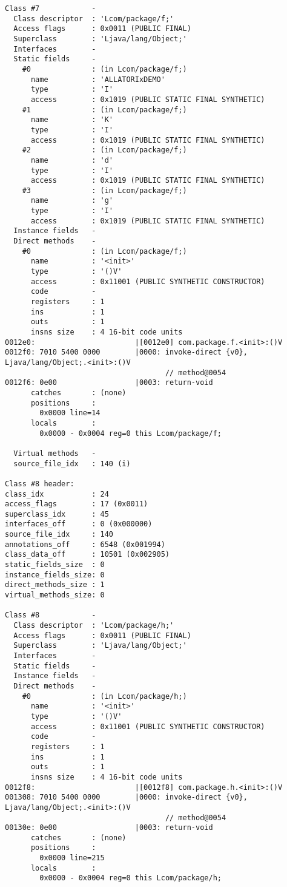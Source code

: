 \begin{lstlisting}
Class #7            -
  Class descriptor  : 'Lcom/package/f;'
  Access flags      : 0x0011 (PUBLIC FINAL)
  Superclass        : 'Ljava/lang/Object;'
  Interfaces        -
  Static fields     -
    #0              : (in Lcom/package/f;)
      name          : 'ALLATORIxDEMO'
      type          : 'I'
      access        : 0x1019 (PUBLIC STATIC FINAL SYNTHETIC)
    #1              : (in Lcom/package/f;)
      name          : 'K'
      type          : 'I'
      access        : 0x1019 (PUBLIC STATIC FINAL SYNTHETIC)
    #2              : (in Lcom/package/f;)
      name          : 'd'
      type          : 'I'
      access        : 0x1019 (PUBLIC STATIC FINAL SYNTHETIC)
    #3              : (in Lcom/package/f;)
      name          : 'g'
      type          : 'I'
      access        : 0x1019 (PUBLIC STATIC FINAL SYNTHETIC)
  Instance fields   -
  Direct methods    -
    #0              : (in Lcom/package/f;)
      name          : '<init>'
      type          : '()V'
      access        : 0x11001 (PUBLIC SYNTHETIC CONSTRUCTOR)
      code          -
      registers     : 1
      ins           : 1
      outs          : 1
      insns size    : 4 16-bit code units
0012e0:                       |[0012e0] com.package.f.<init>:()V
0012f0: 7010 5400 0000        |0000: invoke-direct {v0}, Ljava/lang/Object;.<init>:()V
                                     // method@0054
0012f6: 0e00                  |0003: return-void
      catches       : (none)
      positions     :
        0x0000 line=14
      locals        :
        0x0000 - 0x0004 reg=0 this Lcom/package/f;

  Virtual methods   -
  source_file_idx   : 140 (i)

Class #8 header:
class_idx           : 24
access_flags        : 17 (0x0011)
superclass_idx      : 45
interfaces_off      : 0 (0x000000)
source_file_idx     : 140
annotations_off     : 6548 (0x001994)
class_data_off      : 10501 (0x002905)
static_fields_size  : 0
instance_fields_size: 0
direct_methods_size : 1
virtual_methods_size: 0

Class #8            -
  Class descriptor  : 'Lcom/package/h;'
  Access flags      : 0x0011 (PUBLIC FINAL)
  Superclass        : 'Ljava/lang/Object;'
  Interfaces        -
  Static fields     -
  Instance fields   -
  Direct methods    -
    #0              : (in Lcom/package/h;)
      name          : '<init>'
      type          : '()V'
      access        : 0x11001 (PUBLIC SYNTHETIC CONSTRUCTOR)
      code          -
      registers     : 1
      ins           : 1
      outs          : 1
      insns size    : 4 16-bit code units
0012f8:                       |[0012f8] com.package.h.<init>:()V
001308: 7010 5400 0000        |0000: invoke-direct {v0}, Ljava/lang/Object;.<init>:()V
                                     // method@0054
00130e: 0e00                  |0003: return-void
      catches       : (none)
      positions     :
        0x0000 line=215
      locals        :
        0x0000 - 0x0004 reg=0 this Lcom/package/h;


\end{lstlisting}

